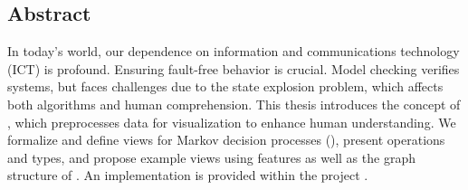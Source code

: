 \documentclass[preview]{standalone}
\begin{document}
\clearpage
\thispagestyle{empty}
\begin{center}
	\section*{Abstract}		
\end{center}
In today's world, our dependence on information and communications technology (ICT) is profound. Ensuring fault-free behavior is crucial. Model checking verifies systems, but faces challenges due to the state explosion problem, which affects both algorithms and human comprehension. This thesis introduces the concept of \emph{\viewN}, which preprocesses data for visualization to enhance human understanding. We formalize and define views for Markov decision processes (\mdpsN), present operations and types, and propose example views using \mdpN features as well as the graph structure of \mdpsN. An implementation is provided within the project \pmcvis.
\end{document}
